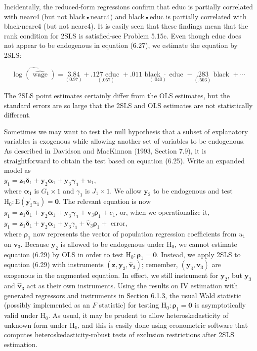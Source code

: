 \documentclass[10pt]{article}
\begin{document}
Incidentally, the reduced-form regressions confirm that educ is partially correlated with nearc4 (but not black•nearc4) and black•educ is partially correlated with black‧nearc4 (but not nearc4). It is easily seen that these findings mean that the rank condition for 2SLS is satisfied-see Problem 5.15c. Even though educ does not appear to be endogenous in equation (6.27), we estimate the equation by 2SLS:

$$
\widehat{\log (\widehat{\text { wage }})}=\underset{(0.97)}{3.84}+\underset{(.057)}{.127 \text { educ }}+\underset{(.040)}{.011 \text { black } \cdot \text { educ }}-\underset{(.506)}{.283} \text { black }+\cdots
$$

The 2SLS point estimates certainly differ from the OLS estimates, but the standard errors are so large that the 2SLS and OLS estimates are not statistically different.

Sometimes we may want to test the null hypothesis that a subset of explanatory variables is exogenous while allowing another set of variables to be endogenous. As described in Davidson and MacKinnon (1993, Section 7.9), it is straightforward to obtain the test based on equation (6.25). Write an expanded model as\\
$y_{1}=\mathbf{z}_{1} \boldsymbol{\delta}_{1}+\mathbf{y}_{2} \boldsymbol{\alpha}_{1}+\mathbf{y}_{3} \boldsymbol{\gamma}_{1}+u_{1}$,\\
where $\boldsymbol{\alpha}_{1}$ is $G_{1} \times 1$ and $\gamma_{1}$ is $J_{1} \times 1$. We allow $\mathbf{y}_{2}$ to be endogenous and test $\mathrm{H}_{0}: \mathrm{E}\left(\mathbf{y}_{3}^{\prime} u_{1}\right)=\mathbf{0}$. The relevant equation is now $y_{1}=\mathbf{z}_{1} \boldsymbol{\delta}_{1}+\mathbf{y}_{2} \boldsymbol{\alpha}_{1}+\mathbf{y}_{3} \boldsymbol{\gamma}_{1}+\mathbf{v}_{3} \boldsymbol{\rho}_{1}+e_{1}$, or, when we operationalize it,\\
$y_{1}=\mathbf{z}_{1} \boldsymbol{\delta}_{1}+\mathbf{y}_{2} \boldsymbol{\alpha}_{1}+\mathbf{y}_{3} \gamma_{1}+\hat{\mathbf{v}}_{3} \boldsymbol{\rho}_{1}+$ error,\\
where $\boldsymbol{\rho}_{1}$ now represents the vector of population regression coefficients from $u_{1}$ on $\mathbf{v}_{3}$. Because $\mathbf{y}_{2}$ is allowed to be endogenous under $\mathrm{H}_{0}$, we cannot estimate equation (6.29) by OLS in order to test $\mathrm{H}_{0}: \boldsymbol{\rho}_{1}=\mathbf{0}$. Instead, we apply 2SLS to equation (6.29) with instruments $\left(\mathbf{z}, \mathbf{y}_{3}, \hat{\mathbf{v}}_{3}\right)$; remember, $\left(\mathbf{y}_{3}, \mathbf{v}_{3}\right)$ are exogenous in the augmented equation. In effect, we still instrument for $\mathbf{y}_{2}$, but $\mathbf{y}_{3}$ and $\hat{\mathbf{v}}_{3}$ act as their own instruments. Using the results on IV estimation with generated regressors and instruments in Section 6.1.3, the usual Wald statistic (possibly implemented as an $F$ statistic) for testing $\mathrm{H}_{0}: \boldsymbol{\rho}_{1}=\mathbf{0}$ is asymptotically valid under $\mathrm{H}_{0}$. As usual, it may be prudent to allow heteroskedasticity of unknown form under $\mathrm{H}_{0}$, and this is easily done using econometric software that computes heteroskedasticity-robust tests of exclusion restrictions after 2SLS estimation.
\end{document}
